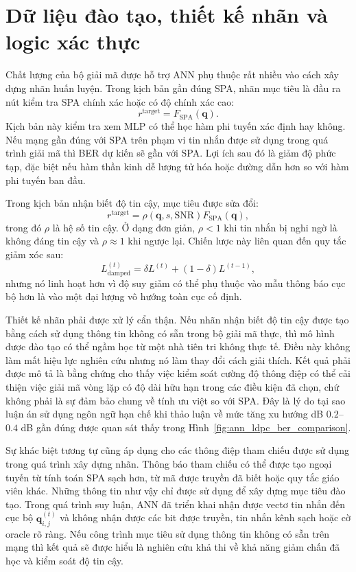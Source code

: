 \section{Dữ liệu đào tạo, thiết kế nhãn và logic xác thực}
Chất lượng của bộ giải mã được hỗ trợ ANN phụ thuộc rất nhiều vào cách xây dựng nhãn huấn luyện. Trong kịch bản gần đúng SPA, nhãn mục tiêu là đầu ra nút kiểm tra SPA chính xác hoặc có độ chính xác cao:
\begin{equation}
  r^{\mathrm{target}}=F_{\mathrm{SPA}}(\mathbf{q}).
\end{equation}
Kịch bản này kiểm tra xem MLP có thể học hàm phi tuyến xác định hay không. Nếu mạng gần đúng với SPA trên phạm vi tin nhắn được sử dụng trong quá trình giải mã thì BER dự kiến ​​sẽ gần với SPA. Lợi ích sau đó là giảm độ phức tạp, đặc biệt nếu hàm thần kinh dễ lượng tử hóa hoặc đường dẫn hơn so với hàm phi tuyến ban đầu.

Trong kịch bản nhận biết độ tin cậy, mục tiêu được sửa đổi:
\begin{equation}
  r^{\mathrm{target}}=\rho(\mathbf{q},s,\mathrm{SNR})F_{\mathrm{SPA}}(\mathbf{q}),
\end{equation}
trong đó $\rho$ là hệ số tin cậy. Ở dạng đơn giản, $\rho<1$ khi tin nhắn bị nghi ngờ là không đáng tin cậy và $\rho\approx 1$ khi ngược lại. Chiến lược này liên quan đến quy tắc giảm xóc sau:
\begin{equation}
  L^{(t)}_{\mathrm{damped}}
  =
  \delta L^{(t)}+(1-\delta)L^{(t-1)},
\end{equation}
nhưng nó linh hoạt hơn vì độ suy giảm có thể phụ thuộc vào mẫu thông báo cục bộ hơn là vào một đại lượng vô hướng toàn cục cố định.

Thiết kế nhãn phải được xử lý cẩn thận. Nếu nhãn nhận biết độ tin cậy được tạo bằng cách sử dụng thông tin không có sẵn trong bộ giải mã thực, thì mô hình được đào tạo có thể ngầm học từ một nhà tiên tri không thực tế. Điều này không làm mất hiệu lực nghiên cứu nhưng nó làm thay đổi cách giải thích. Kết quả phải được mô tả là bằng chứng cho thấy việc kiểm soát cường độ thông điệp có thể cải thiện việc giải mã vòng lặp có độ dài hữu hạn trong các điều kiện đã chọn, chứ không phải là sự đảm bảo chung về tính ưu việt so với SPA. Đây là lý do tại sao luận án sử dụng ngôn ngữ hạn chế khi thảo luận về mức tăng xu hướng dB $0.2$--$0.4$ dB gần đúng được quan sát thấy trong Hình~\ref{fig:ann_ldpc_ber_comparison}.

Sự khác biệt tương tự cũng áp dụng cho các thông điệp tham chiếu được sử dụng trong quá trình xây dựng nhãn. Thông báo tham chiếu có thể được tạo ngoại tuyến từ tính toán SPA sạch hơn, từ mã được truyền đã biết hoặc quy tắc giáo viên khác. Những thông tin như vậy chỉ được sử dụng để xây dựng mục tiêu đào tạo. Trong quá trình suy luận, ANN đã triển khai nhận được vectơ tin nhắn đến cục bộ $\mathbf{q}_{i,j}^{(t)}$ và không nhận được các bit được truyền, tin nhắn kênh sạch hoặc cờ oracle rõ ràng. Nếu công trình mục tiêu sử dụng thông tin không có sẵn trên mạng thì kết quả sẽ được hiểu là nghiên cứu khả thi về khả năng giảm chấn đã học và kiểm soát độ tin cậy.

